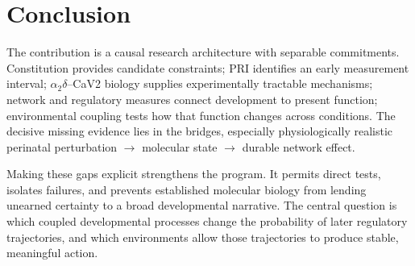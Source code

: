 \section{Conclusion}

The contribution is a causal research architecture with separable commitments. Constitution provides candidate constraints; PRI identifies an early measurement interval; \ensuremath{\alpha_2\delta}–CaV2 biology supplies experimentally tractable mechanisms; network and regulatory measures connect development to present function; environmental coupling tests how that function changes across conditions. The decisive missing evidence lies in the bridges, especially physiologically realistic perinatal perturbation \ensuremath{\rightarrow} molecular state \ensuremath{\rightarrow} durable network effect.

Making these gaps explicit strengthens the program. It permits direct tests, isolates failures, and prevents established molecular biology from lending unearned certainty to a broad developmental narrative. The central question is which coupled developmental processes change the probability of later regulatory trajectories, and which environments allow those trajectories to produce stable, meaningful action.
